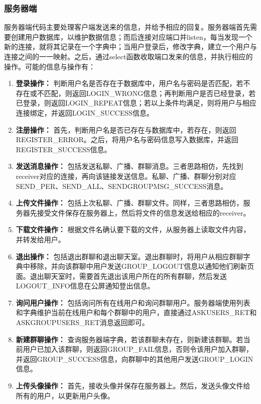\documentclass[12pt]{article} %
\begin{document}
\begin{sloppypar}
\subsubsection{服务器端}

服务器端代码主要处理客户端发送来的信息，并给予相应的回复。服务器端首先需要创建用户数据库，以维护数据信息；而后连接对应端口并listen，每当发现一个新的连接，就将其记录在一个字典中；当用户登录后，修改字典，建立一个用户与连接之间的一一映射。之后，通过select函数收取端口发来的信息，并执行相应的操作。可能的信息与操作有：
\begin{enumerate}
	\item {\bf 登录操作：} 判断用户名是否存在于数据库中，用户名与密码是否匹配，若不存在或不匹配，则返回LOGIN\_WRONG信息；再判断用户是否已经登录，若已登录，则返回LOGIN\_REPEAT信息；若以上条件均满足，则将用户与相应连接绑定，并返回LOGIN\_SUCCESS信息。
	\item {\bf 注册操作：} 首先，判断用户名是否已存在与数据库中，若存在，则返回REGISTER\_ERROR。之后，将用户名与密码信息写入数据库，并返回REGISTER\_SUCCESS信息。
	\item {\bf 发送消息操作：} 包括发送私聊、广播、群聊消息。三者思路相仿，先找到receiver对应的连接，再向该链接发送信息。私聊、广播、群聊分别对应SEND\_PER、SEND\_ALL、SENDGROUPMSG\_SUCCESS消息。
	\item {\bf 上传文件操作：} 包括上次私聊、广播、群聊文件。同样，三者思路相仿，服务器先接受文件保存在服务器上，然后将文件的信息发送给相应的receiver。
	\item {\bf 下载文件操作：} 根据文件名确认要下载的文件，从服务器上读取文件内容，并转发给用户。
	\item {\bf 退出操作：} 包括退出群聊和退出聊天室。退出群聊时，将用户从相应群聊字典中移除，并向该群聊中用户发送GROUP\_LOGOUT信息以通知他们刷新页面。退出聊天室时，需要首先退出该用户所在的所有群聊，然后发送LOGOUT\_INFO信息在公屏通知登出信息。
	\item {\bf 询问用户操作：} 包括询问所有在线用户和询问群聊用户。服务器端使用列表和字典维护当前在线用户和每个群聊中的用户，直接通过ASKUSERS\_RET和ASKGROUPUSERS\_RET消息返回即可。
	\item {\bf 新建群聊操作：} 查询服务器端字典，若该群聊未存在，则新建该群聊。若当前用户已加入该群聊，则返回GROUP\_FAIL信息，否则令该用户加入群聊，并返回GROUP\_SUCCESS信息，向群聊中的其他用户发送GROUP\_LOGIN信息。
	\item {\bf 上传头像操作：} 首先，接收头像并保存在服务器上。然后，发送头像文件给所有的用户，以更新用户头像。
\end{enumerate}


\end{sloppypar}
\end{document}
